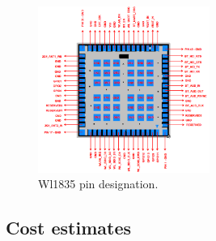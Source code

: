\begin{figure}[!htb]
    \centering
    \includegraphics[width=0.5\textwidth,keepaspectratio]{chap/hardFig/100_pin_MOC_wl1835_package}
    \caption{Wl1835 pin designation.}
    \label{fig:wl1835 pcb antennas}
\end{figure}

\subsection{Cost estimates}
